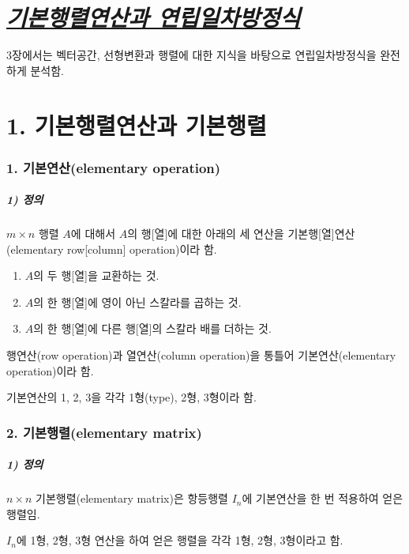 \part{\textit{\underline{기본행렬연산과 연립일차방정식}}}

3장에서는 벡터공간, 선형변환과 행렬에 대한 지식을 바탕으로 연립일차방정식을 완전하게 분석함.

\part*{1. 기본행렬연산과 기본행렬}

\section*{1. 기본연산(elementary operation)}

\subsubsection*{1) 정의\\}
\begin{DEF}
$m \times n$ 행렬 $A$에 대해서 $A$의 행[열]에 대한 아래의 세 연산을 기본행[열]연산(elementary row[column] operation)이라 함.

\begin{enumerate}
    \item $A$의 두 행[열]을 교환하는 것.
    \item $A$의 한 행[열]에 영이 아닌 스칼라를 곱하는 것.
    \item $A$의 한 행[열]에 다른 행[열]의 스칼라 배를 더하는 것.
\end{enumerate}

행연산(row operation)과 열연산(column operation)을 통틀어 기본연산(elementary operation)이라 함.

기본연산의 1, 2, 3을 각각 1형(type), 2형, 3형이라 함.
\end{DEF}

\section*{2. 기본행렬(elementary matrix)}

\subsubsection*{1) 정의\\}
\begin{DEF}
$n \times n$ 기본행렬(elementary matrix)은 항등행렬 $I_n$에 기본연산을 한 번 적용하여 얻은 행렬임.

$I_n$에 1형, 2형, 3형 연산을 하여 얻은 행렬을 각각 1형, 2형, 3형이라고 함.
\end{DEF}


